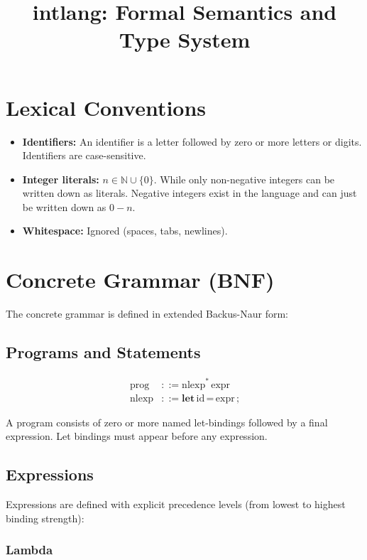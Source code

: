 \documentclass[12pt]{article}
\title{intlang: Formal Semantics and Type System}
\author{}
\date{}
\begin{document}
\maketitle

\section{Lexical Conventions}

\begin{itemize}
  \item \textbf{Identifiers:} An identifier is a letter followed by zero or more letters or digits. Identifiers are case-sensitive.
  \item \textbf{Integer literals:} $ n \in \mathbb{N} \cup \{0\} $. While only non-negative integers can be written down as literals. Negative integers exist in the language and can just be written down as $0 - n$.
  \item \textbf{Whitespace:} Ignored (spaces, tabs, newlines).
\end{itemize}

\section{Concrete Grammar (BNF)}

The concrete grammar is defined in extended Backus-Naur form:

\subsection{Programs and Statements}

\begin{align*}
\text{prog} &::= \text{nlexp}^* \, \text{expr} \\
\text{nlexp} &::= \textbf{let} \, \text{id} \, \textbf{=} \, \text{expr} \, \textbf{;}
\end{align*}

A program consists of zero or more named let-bindings followed by a final expression. Let bindings must appear before any expression.

\subsection{Expressions}

Expressions are defined with explicit precedence levels (from lowest to highest binding strength):

\subsubsection{Lambda}
\end{document}
